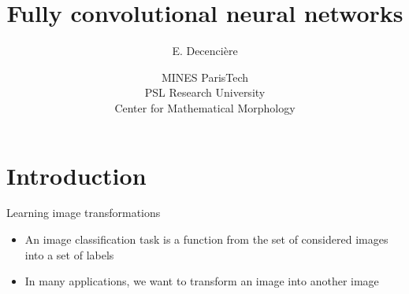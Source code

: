 \documentclass[xcolor=pdftex,dvipsnames,table,mathserif]{beamer}
\title{Fully convolutional neural networks}
\author{E. Decencière}
\date{MINES ParisTech\\
  PSL Research University\\
  Center for Mathematical Morphology
}
\begin{document}
\frame{\titlepage}


\section{Introduction}










\begin{frame}{Learning image transformations}

  \begin{itemize}
  \item An image classification task is a function from the set of considered images into a set of labels
  \item In many applications, we want to transform an image into another image
  \end{itemize}

\end{frame}
\end{document}
